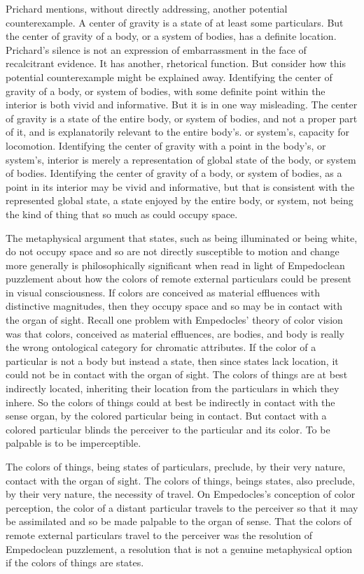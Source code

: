 Prichard mentions, without directly addressing, another potential counterexample. A center of gravity is a state of at least some particulars. But the center of gravity of a body, or a system of bodies, has a definite location. Prichard's silence is not an expression of embarrassment in the face of recalcitrant evidence. It has another, rhetorical function. But consider how this potential counterexample might be explained away. Identifying the center of gravity of a body, or system of bodies, with some definite point within the interior is both vivid and informative. But it is in one way misleading. The center of gravity is a state of the entire body, or system of bodies, and not a proper part of it, and is explanatorily relevant to the entire body's. or system's, capacity for locomotion. Identifying the center of gravity with a point in the body's, or system's, interior is merely a representation of global state of the body, or system of bodies. Identifying the center of gravity of a body, or system of bodies, as a point in its interior may be vivid and informative, but that is consistent with the represented global state, a state enjoyed by the entire body, or system, not being the kind of thing that so much as could occupy space.

The metaphysical argument that states, such as being illuminated or being white, do not occupy space and so are not directly susceptible to motion and change more generally is philosophically significant when read in light of Empedoclean puzzlement about how the colors of remote external particulars could be present in visual consciousness. If colors are conceived as material effluences with distinctive magnitudes, then they occupy space and so may be in contact with the organ of sight. Recall one problem with Empedocles' theory of color vision was that colors, conceived as material effluences, are bodies, and body is really the wrong ontological category for chromatic attributes. If the color of a particular is not a body but instead a state, then since states lack location, it could not be in contact with the organ of sight. The colors of things are at best indirectly located, inheriting their location from the particulars in which they inhere. So the colors of things could at best be indirectly in contact with the sense organ, by the colored particular being in contact. But contact with a colored particular blinds the perceiver to the particular and its color. To be palpable is to be imperceptible.

The colors of things, being states of particulars, preclude, by their very nature, contact with the organ of sight. The colors of things, beings states, also preclude, by their very nature, the necessity of travel. On Empedocles's conception of color perception, the color of a distant particular travels to the perceiver so that it may be assimilated and so be made palpable to the organ of sense. That the colors of remote external particulars travel to the perceiver was the resolution of Empedoclean puzzlement, a resolution that is not a genuine metaphysical option if the colors of things are states. 

